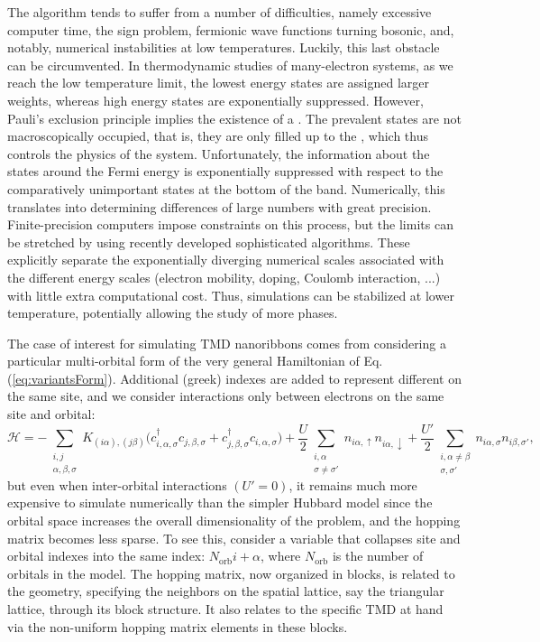 The algorithm tends to suffer from a number of difficulties, namely excessive computer time, the sign problem, fermionic wave functions turning bosonic, and, notably,  numerical instabilities at low temperatures.
Luckily, this last obstacle can be circumvented.
In thermodynamic studies of many-electron systems, as we reach the low temperature limit, the lowest energy states are assigned larger weights, whereas high energy states are exponentially suppressed.
However, Pauli's exclusion principle implies the existence of a .
The prevalent states are not macroscopically occupied, that is, they are only filled up to the , which thus controls the physics of the system.
Unfortunately, the information about the states around the Fermi energy is exponentially suppressed with respect to the comparatively unimportant states at the bottom of the band.
Numerically, this translates into determining differences of large numbers with great precision.
Finite-precision computers impose constraints on this process, but the limits can be stretched by using recently developed sophisticated algorithms.
These explicitly separate the exponentially diverging numerical scales associated with the different energy scales (electron mobility, doping, Coulomb interaction, ...) with little extra computational cost.
Thus, simulations can be stabilized at lower temperature, potentially allowing the study of more phases.

The case of interest for simulating \acs{TMD} nanoribbons comes from considering a particular multi-orbital form of the very general Hamiltonian of Eq.(\ref{eq:variantsForm}).
Additional (greek) indexes are added to represent different  on the same site, and we consider interactions only between electrons on the same site and  orbital:
\begin{equation}\label{eq:variantTMD}
\mathcal{H} = - \sum_{\substack{i, j \\ \alpha, \beta, \sigma}} K_{(i\alpha),(j\beta )} \bigg( c_{i,\alpha, \sigma}^\dagger c_{j,\beta, \sigma} + c_{j,\beta , \sigma}^\dagger c_{i,\alpha, \sigma} \bigg) + \frac{U}{2} \sum_{\substack{i, \alpha \\ \sigma \neq \sigma'} } n_{i\alpha, \uparrow} n_{i\alpha, \downarrow} + \frac{U'}{2} \sum_{\substack{i, \alpha \neq \beta \\ \sigma, \sigma'}} n_{i\alpha, \sigma} n_{i\beta, \sigma'} ,
\end{equation}
but even when inter-orbital interactions $(U' = 0)$, it remains much more expensive to simulate numerically than the simpler Hubbard model since the orbital space increases the overall dimensionality of the problem, and the hopping matrix becomes less sparse.
To see this, consider a variable that collapses site and orbital indexes into the same index: $ N_{\text{orb}} i + \alpha$, where $N_{\text{orb}}$ is the number of orbitals in the model.
The hopping matrix, now organized in blocks, is related to the geometry, specifying the neighbors on the spatial lattice, say the triangular lattice, through its block structure.
It also relates to the specific \acs{TMD} at hand via the non-uniform hopping matrix elements in these blocks.
